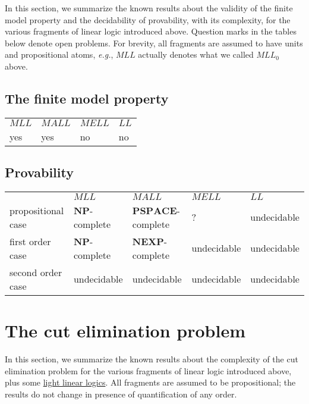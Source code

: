 In this section, we summarize the known results about the validity of
the finite model property and the decidability of provability, with its
complexity, for the various fragments of linear logic introduced above.
Question marks in the tables below denote open problems. For brevity,
all fragments are assumed to have units and propositional atoms,
\emph{e.g.}, \(MLL\) actually denotes what we called \(MLL_0\) above.

\subsection{The finite model property}\label{the-finite-model-property}

\begin{center}
\begin{tabular}{llll}
\hline
\(MLL\) & \(MALL\) & \(MELL\) & \(LL\)\\
yes & yes & no & no\\
\hline
\end{tabular}
\end{center}

\subsection{Provability}\label{provability}

\begin{center}
\begin{tabular}{lllll}
\hline
& \(MLL\) & \(MALL\) & \(MELL\) & \(LL\)\\
propositional case & \(\mathbf{NP}\)-complete &
\(\mathbf{PSPACE}\)-complete & ? & undecidable\\
first order case & \(\mathbf{NP}\)-complete & \(\mathbf{NEXP}\)-complete
& undecidable & undecidable\\
second order case & undecidable & undecidable & undecidable &
undecidable\\
\hline
\end{tabular}
\end{center}

\section{The cut elimination problem}\label{the-cut-elimination-problem}

In this section, we summarize the known results about the complexity of
the cut elimination problem for the various fragments of linear logic
introduced above, plus some \hyperref[light-linear-logics]{light linear
logics}. All fragments are assumed to be propositional; the results do
not change in presence of quantification of any order.

